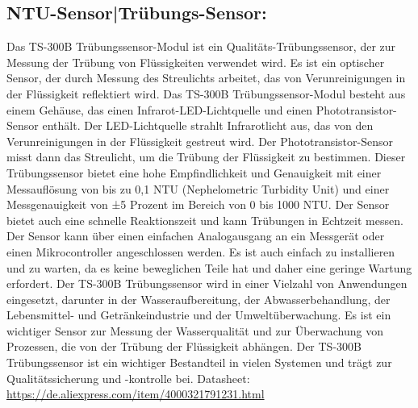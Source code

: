 \subsection*{NTU-Sensor|Trübungs-Sensor:}
Das TS-300B Trübungssensor-Modul ist ein Qualitäts-Trübungssensor, der zur Messung der Trübung von Flüssigkeiten verwendet wird. 
Es ist ein optischer Sensor, der durch Messung des Streulichts arbeitet, das von Verunreinigungen in der Flüssigkeit reflektiert wird.
Das TS-300B Trübungssensor-Modul besteht aus einem Gehäuse, das einen Infrarot-LED-Lichtquelle und einen Phototransistor-Sensor enthält. 
Der LED-Lichtquelle strahlt Infrarotlicht aus, das von den Verunreinigungen in der Flüssigkeit gestreut wird. Der Phototransistor-Sensor misst dann das Streulicht, um die Trübung der Flüssigkeit zu bestimmen. 
Dieser Trübungssensor bietet eine hohe Empfindlichkeit und Genauigkeit mit einer Messauflösung von bis zu 0,1 NTU (Nephelometric Turbidity Unit) und einer Messgenauigkeit von ±5 Prozent im Bereich von 0 bis 1000 NTU. 
Der Sensor bietet auch eine schnelle Reaktionszeit und kann Trübungen in Echtzeit messen. Der Sensor kann über einen einfachen Analogausgang an ein Messgerät oder einen Mikrocontroller angeschlossen werden. Es ist auch einfach zu installieren und zu warten, da es keine beweglichen Teile hat und daher eine geringe Wartung erfordert. 
Der TS-300B Trübungssensor wird in einer Vielzahl von Anwendungen eingesetzt, darunter in der Wasseraufbereitung, der Abwasserbehandlung, der Lebensmittel- und Getränkeindustrie und der Umweltüberwachung. Es ist ein wichtiger Sensor zur Messung der Wasserqualität und zur Überwachung von Prozessen, die von der Trübung der Flüssigkeit abhängen. 
Der TS-300B Trübungssensor ist ein wichtiger Bestandteil in vielen Systemen und trägt zur Qualitätssicherung und -kontrolle bei. 
\newline
Datasheet: \url{https://de.aliexpress.com/item/4000321791231.html}


\newpage
